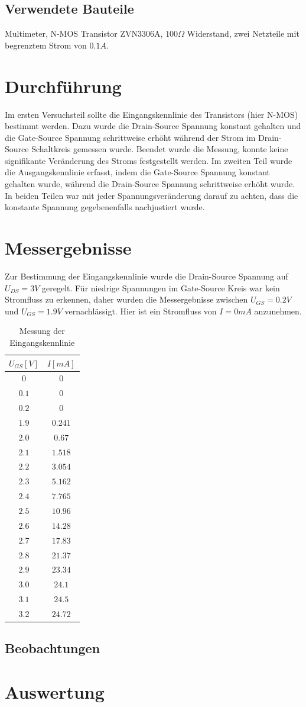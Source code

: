 \documentclass[11pt, a4paper]{article}
\begin{document}
\subsection*{Verwendete Bauteile}
Multimeter, N-MOS Transistor ZVN3306A, $100 \Omega$ Widerstand, zwei Netzteile mit begrenztem Strom von $0.1 A$.
\section*{Durchführung}
Im ersten Versuchsteil sollte die Eingangskennlinie des Transistors (hier N-MOS) bestimmt werden. Dazu wurde die Drain-Source Spannung konstant gehalten und die Gate-Source Spannung schrittweise erhöht während der Strom im Drain-Source Schaltkreis gemessen wurde. Beendet wurde die Messung, konnte keine signifikante Veränderung des Stroms festgestellt werden.
Im zweiten Teil wurde die Ausgangskennlinie erfasst, indem die Gate-Source Spannung konstant gehalten wurde, während die Drain-Source Spannung schrittweise erhöht wurde.
In beiden Teilen war mit jeder Spannungsveränderung darauf zu achten, dass die konstante Spannung gegebenenfalls nachjustiert wurde.
\section*{Messergebnisse}
Zur Bestimmung der Eingangskennlinie wurde die Drain-Source Spannung auf $U_{DS} = 3 V$ geregelt. Für niedrige Spannungen im Gate-Source Kreis war kein Stromfluss zu erkennen, daher wurden die Messergebnisse zwischen $U_{GS} = 0.2 V$ und $U_{GS} = 1.9 V$
vernachlässigt. Hier ist ein Stromfluss von $I = 0 mA$ anzunehmen.
\begin{table}[h]
\centering
\begin{tabular}{c|c}
$U_{GS} [V]$ & $I [mA]$ \\ \hline
$0$ 	& $0$ \\
$0.1$ 	& $0$ \\
$0.2$ 	& $0$ \\
$1.9$	& $0.241$ \\
$2.0$	& $0.67$ \\
$2.1$	& $1.518$ \\
$2.2$	& $3.054$ \\
$2.3$	& $5.162$ \\
$2.4$	& $7.765$ \\
$2.5$	& $10.96$ \\
$2.6$	& $14.28$ \\
$2.7$	& $17.83$ \\
$2.8$	& $21.37$ \\
$2.9$	& $23.34$ \\
$3.0$	& $24.1$ \\
$3.1$	& $24.5$ \\
$3.2$	& $24.72$
\end{tabular}
\caption{Messung der Eingangskennlinie}
\label{eingangskennlinie}
\end{table}
\subsection*{Beobachtungen}
\section*{Auswertung}
\end{document}
